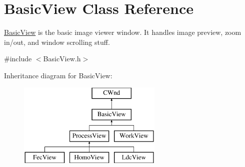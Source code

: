 \hypertarget{class_basic_view}{}\section{Basic\+View Class Reference}
\label{class_basic_view}


\mbox{\hyperlink{class_basic_view}{Basic\+View}} is the basic image viewer window. It handles image preview, zoom in/out, and window scrolling stuff.  




{\ttfamily \#include $<$Basic\+View.\+h$>$}

Inheritance diagram for Basic\+View\+:\begin{figure}[H]
\begin{center}
\leavevmode
\includegraphics[height=4.000000cm]{class_basic_view}
\end{center}
\end{figure}
